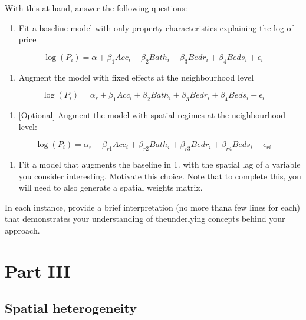 \documentclass[
  letterpaper,
  krantz2]{style/krantz}
\providecommand{\tightlist}{%
  \setlength{\itemsep}{0pt}\setlength{\parskip}{0pt}}\usepackage{longtable,booktabs,array}
\begin{document}
With this at hand, answer the following questions:

\begin{enumerate}
\def\labelenumi{\arabic{enumi}.}
\tightlist
\item
  Fit a baseline model with only property characteristics explaining the
  log of price
\end{enumerate}

\[
\log(P_i) = \alpha + \beta_1 Acc_i + \beta_2 Bath_i + \beta_3 Bedr_i + \beta_4 Beds_i + \epsilon_i
\]

\begin{enumerate}
\def\labelenumi{\arabic{enumi}.}
\setcounter{enumi}{1}
\tightlist
\item
  Augment the model with fixed effects at the neighbourhood level
\end{enumerate}

\[
\log(P_i) = \alpha_r + \beta_1 Acc_i + \beta_2 Bath_i + \beta_3 Bedr_i + \beta_4 Beds_i + \epsilon_i
\]

\begin{enumerate}
\def\labelenumi{\arabic{enumi}.}
\setcounter{enumi}{2}
\tightlist
\item
  {[}Optional{]} Augment the model with spatial regimes at the
  neighbourhood level:
\end{enumerate}

\[
\log(P_i) = \alpha_r + \beta_{r1} Acc_i + \beta_{r2} Bath_i + \beta_{r3} Bedr_i + \beta_{r4} Beds_i + \epsilon_{ri}
\]

\begin{enumerate}
\def\labelenumi{\arabic{enumi}.}
\setcounter{enumi}{3}
\tightlist
\item
  Fit a model that augments the baseline in 1. with the spatial lag of a
  variable you consider interesting. Motivate this choice. Note that to
  complete this, you will need to also generate a spatial weights
  matrix.
\end{enumerate}

In each instance, provide a brief interpretation (no more thana few
lines for each) that demonstrates your understanding of theunderlying
concepts behind your approach.

\part{Part III}

\hypertarget{spatial-heterogeneity-2}{%
\chapter{Spatial heterogeneity}\label{spatial-heterogeneity-2}}
\end{document}
